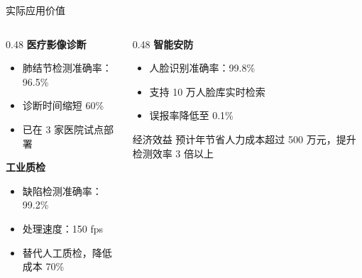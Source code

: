 \documentclass[aspectratio=169,11pt]{beamer}
\begin{document}
\begin{frame}{实际应用价值}
    \begin{columns}[T]
        \begin{column}{0.48\textwidth}
            \textbf{医疗影像诊断}
            \begin{itemize}
                \item 肺结节检测准确率：96.5\%
                \item 诊断时间缩短 60\%
                \item 已在 3 家医院试点部署
            \end{itemize}
            
            \vspace{1em}
            \textbf{工业质检}
            \begin{itemize}
                \item 缺陷检测准确率：99.2\%
                \item 处理速度：150 fps
                \item 替代人工质检，降低成本 70\%
            \end{itemize}
        \end{column}
        \begin{column}{0.48\textwidth}
            \textbf{智能安防}
            \begin{itemize}
                \item 人脸识别准确率：99.8\%
                \item 支持 10 万人脸库实时检索
                \item 误报率降低至 0.1\%
            \end{itemize}
            
            \vspace{1em}
            \begin{alertblock}{经济效益}
                预计年节省人力成本超过 500 万元，提升检测效率 3 倍以上
            \end{alertblock}
        \end{column}
    \end{columns}
\end{frame}
\end{document}
